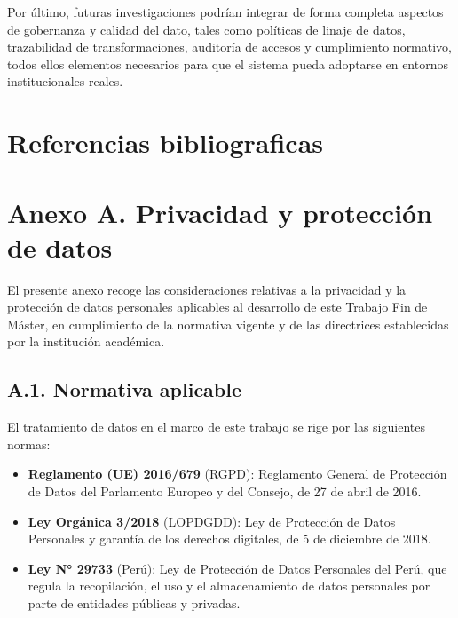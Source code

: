 \documentclass[12pt,a4paper]{article}
\providecommand{\tightlist}{%
  \setlength{\itemsep}{0pt}\setlength{\parskip}{0pt}}
\begin{document}
Por último, futuras investigaciones podrían integrar de forma completa aspectos de gobernanza y calidad del dato, tales como políticas de linaje de datos, trazabilidad de transformaciones, auditoría de accesos y cumplimiento normativo, todos ellos elementos necesarios para que el sistema pueda adoptarse en entornos institucionales reales.

\newpage
\section*{Referencias bibliograficas}
\printbibliography[heading=none]


\newpage
\section*{Anexo A. Privacidad y protección de datos}

El presente anexo recoge las consideraciones relativas a la privacidad y la protección de datos personales aplicables al desarrollo de este Trabajo Fin de Máster, en cumplimiento de la normativa vigente y de las directrices establecidas por la institución académica.

\subsection*{A.1. Normativa aplicable}

El tratamiento de datos en el marco de este trabajo se rige por las siguientes normas:

\begin{itemize}
    \tightlist
    \item \textbf{Reglamento (UE) 2016/679} (RGPD): Reglamento General de Protección de Datos del Parlamento Europeo y del Consejo, de 27 de abril de 2016.
    \item \textbf{Ley Orgánica 3/2018} (LOPDGDD): Ley de Protección de Datos Personales y garantía de los derechos digitales, de 5 de diciembre de 2018.
    \item \textbf{Ley N° 29733} (Perú): Ley de Protección de Datos Personales del Perú, que regula la recopilación, el uso y el almacenamiento de datos personales por parte de entidades públicas y privadas.
\end{itemize}
\end{document}
